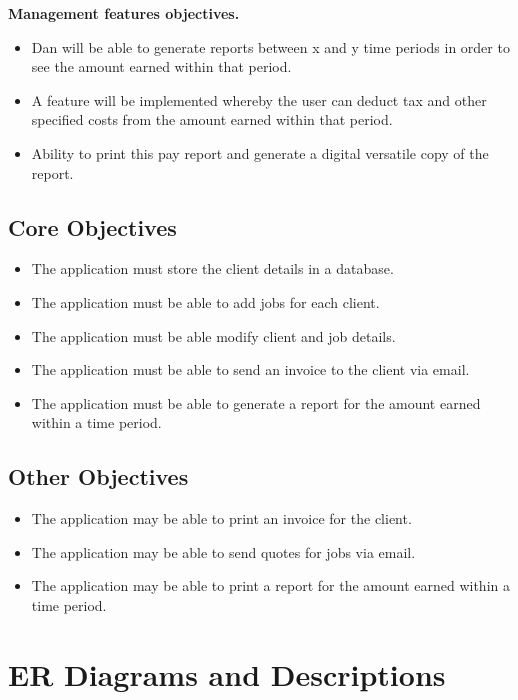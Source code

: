 	\textbf{Management features objectives.}
	
		\begin{itemize}
			\item Dan will be able to generate reports between x and y time periods in order to see the amount earned within that period.
			\item A feature will be implemented whereby the user can deduct tax and other specified costs from the amount earned within that period.
			\item Ability to print this pay report and generate a digital versatile copy of the report.
		\end{itemize}	


\subsection{Core Objectives}
	
	\begin{itemize}
		\item The application must store the client details in a database.
		\item The application must be able to add jobs for each client.
		\item The application must be able  modify client and job details.
		\item The application must be able to send an invoice to the client via email.
		\item The application must be able to generate a report for the amount earned within a time period.
	\end{itemize}


\subsection{Other Objectives}

	\begin{itemize}
		\item The application may be able to print an invoice for the client.
		\item The application may be able to send quotes for jobs via email.
		\item The application may be able to print a report for the amount earned within a time period.
	
	\end{itemize}



\section{ER Diagrams and Descriptions}

